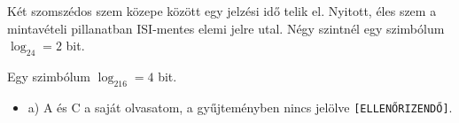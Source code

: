 Két szomszédos szem közepe között egy jelzési idő telik el. Nyitott, éles szem a mintavételi pillanatban ISI-mentes elemi jelre utal. Négy szintnél egy szimbólum $\log_24=2$ bit.

\begin{center}\end{center}

\begin{center}\end{center}

Egy szimbólum $\log_216=4$ bit.

\begin{center}\end{center}
\begin{eredmeny}

\begin{center}\end{center}
\end{eredmeny}
\begin{tipp}[Ellenőrzés]
\begin{itemize}
\item a) A és C a saját olvasatom, a gyűjteményben nincs jelölve \texttt{[ELLENŐRIZENDŐ]}.
\end{itemize}
\end{tipp}


